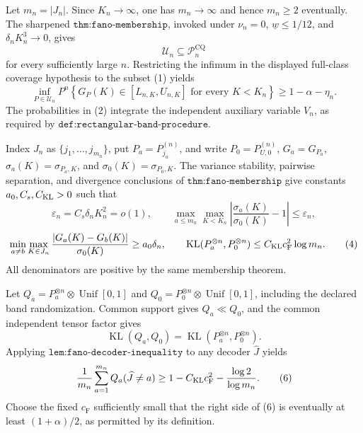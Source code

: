 Let \(m_n=|J_n|\).  Since \(K_n\to\infty\), one has \(m_n\to\infty\) and hence \(m_n\geq2\) eventually.  The sharpened \(\texttt{thm:fano-membership}\), invoked under \(\nu_n=0\), \(\underline w\leq1/12\), and \(\delta_nK_n^3\to0\), gives
\[
 \mathcal U_n\subseteq\mathcal P_n^{\mathrm{CQ}}                                              \tag{1}
\]
for every sufficiently large \(n\).  Restricting the infimum in the displayed full-class coverage hypothesis to the subset (1) yields
\[
 \inf_{P\in\mathcal U_n}P^n\!\left\{G_P(K)\in[L_{n,K},U_{n,K}]
 \text{ for every }K<K_n\right\}\geq1-\alpha-\eta_n.                                  \tag{2}
\]
The probabilities in (2) integrate the independent auxiliary variable \(V_n\), as required by \(\texttt{def:rectangular-band-procedure}\).

Index \(J_n\) as \(\{j_1,\ldots,j_{m_n}\}\), put \(P_a=P_{j_a}^{(n)}\), and write \(P_0=P_{U,0}^{(n)}\), \(G_a=G_{P_a}\), \(\sigma_a(K)=\sigma_{P_a,K}\), and \(\sigma_0(K)=\sigma_{P_0,K}\).  The variance stability, pairwise separation, and divergence conclusions of \(\texttt{thm:fano-membership}\) give constants \(a_0,C_s,C_{\rm KL}>0\) such that
\[
 \varepsilon_n=C_s\delta_nK_n^2=o(1),\qquad
 \max_{a\leq m_n}\max_{K<K_n}\left|\frac{\sigma_a(K)}{\sigma_0(K)}-1\right|
 \leq\varepsilon_n,                                                                     \tag{3}
\]
\[
 \min_{a\ne b}\max_{K\in J_n}\frac{|G_a(K)-G_b(K)|}{\sigma_0(K)}\geq a_0\delta_n,
 \qquad
 \operatorname{KL}(P_a^{\otimes n},P_0^{\otimes n})
 \leq C_{\rm KL}c_{\mathrm F}^2\log m_n.                                               \tag{4}
\]
All denominators are positive by the same membership theorem.

Let \(Q_a=P_a^{\otimes n}\otimes\operatorname{Unif}[0,1]\) and \(Q_0=P_0^{\otimes n}\otimes\operatorname{Unif}[0,1]\), including the declared band randomization.  Common support gives \(Q_a\ll Q_0\), and the common independent tensor factor gives
\[
 \operatorname{KL}(Q_a,Q_0)=\operatorname{KL}(P_a^{\otimes n},P_0^{\otimes n}).          \tag{5}
\]
Applying \(\texttt{lem:fano-decoder-inequality}\) to any decoder \(\widehat J\) yields
\[
 \frac1{m_n}\sum_{a=1}^{m_n}Q_a(\widehat J\ne a)
 \geq1-C_{\rm KL}c_{\mathrm F}^2-\frac{\log2}{\log m_n}.                              \tag{6}
\]
Choose the fixed \(c_{\mathrm F}\) sufficiently small that the right side of (6) is eventually at least \((1+\alpha)/2\), as permitted by its definition.

